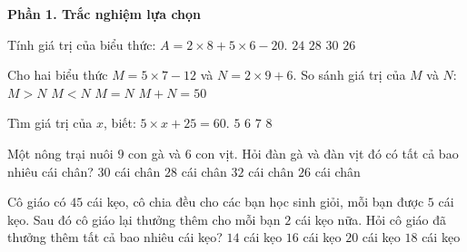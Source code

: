 \textbf{Phần 1. Trắc nghiệm lựa chọn}

\begin{ex} %
Tính giá trị của biểu thức: $A = 2 \times 8 + 5 \times 6 - 20$.
\choice
{$24$}
{$28$}
{$30$}
{\True $26$}
\end{ex}

\begin{ex} %
Cho hai biểu thức $M = 5 \times 7 - 12$ và $N = 2 \times 9 + 6$. So sánh giá trị của $M$ và $N$:
\choice
{$M > N$}
{\True $M < N$}
{$M = N$}
{$M + N = 50$}
\end{ex}

\begin{ex} %
Tìm giá trị của $x$, biết: $5 \times x + 25 = 60$.
\choice
{$5$}
{$6$}
{\True $7$}
{$8$}
\end{ex}

\begin{ex} %
Một nông trại nuôi $9$ con gà và $6$ con vịt. Hỏi đàn gà và đàn vịt đó có tất cả bao nhiêu cái chân?
\choice
{\True $30$ cái chân}
{$28$ cái chân}
{$32$ cái chân}
{$26$ cái chân}
\end{ex}

\begin{ex} %
Cô giáo có $45$ cái kẹo, cô chia đều cho các bạn học sinh giỏi, mỗi bạn được $5$ cái kẹo. Sau đó cô giáo lại thưởng thêm cho mỗi bạn $2$ cái kẹo nữa. Hỏi cô giáo đã thưởng thêm tất cả bao nhiêu cái kẹo?
\choice
{$14$ cái kẹo}
{$16$ cái kẹo}
{$20$ cái kẹo}
{\True $18$ cái kẹo}
\end{ex}

